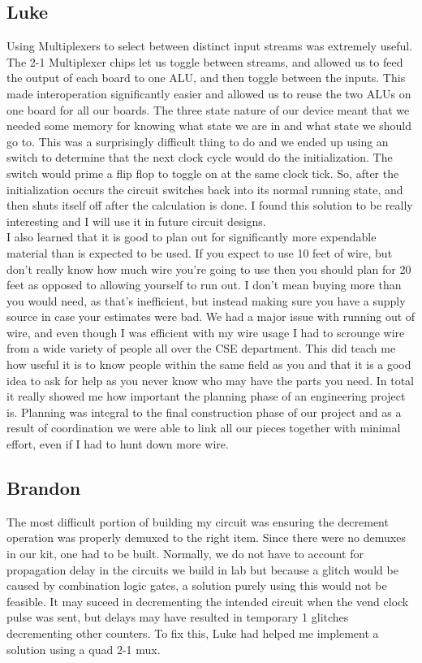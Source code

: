 \subsection{Luke}
Using Multiplexers to select between distinct input streams was extremely useful. The 2-1 Multiplexer chips let us toggle between streams, and allowed us to feed the output of each board to one ALU, and then toggle between the inputs. This made interoperation significantly easier and allowed us to reuse the two ALUs on one board for all our boards. The three state nature of our device meant that we needed some memory for knowing what state we are in and what state we should go to. This was a surprisingly difficult thing to do and we ended up using an switch to determine that the next clock cycle would do the initialization. The switch would prime a flip flop to toggle on at the same clock tick. So, after the initialization occurs the circuit switches back into its normal running state, and then shuts itself off after the calculation is done. I found this solution to be really interesting and I will use it in future circuit designs.\\


I also learned that it is good to plan out for significantly more expendable material than is expected to be used. If you expect to use 10 feet of wire, but don't really know how much wire you're going to use then you should plan for 20 feet as opposed to allowing yourself to run out. I don't mean buying more than you would need, as that's inefficient, but instead making sure you have a supply source in case your estimates were bad. We had a major issue with running out of wire, and even though I was efficient with my wire usage I had to scrounge wire from a wide variety of people all over the CSE department. This did teach me how useful it is to know people within the same field as you and that it is a good idea to ask for help as you never know who may have the parts you need. In total it really showed me how important the planning phase of an engineering project is. Planning was integral to the final construction phase of our project and as a result of coordination we were able to link all our pieces together with minimal effort, even if I had to hunt down more wire.\\


\subsection{Brandon}
The most difficult portion of building my circuit was ensuring the decrement operation was properly demuxed to the right item. Since there were no demuxes in our kit, one had to be built. Normally, we do not have to account for propagation delay in the circuits we build in lab but because a glitch would be caused by combination logic gates, a solution purely using this would not be feasible. It may suceed in decrementing the intended circuit when the vend clock pulse was sent, but delays may have resulted in temporary 1 glitches decrementing other counters. To fix this, Luke had helped me implement a solution using a quad 2-1 mux. \\

